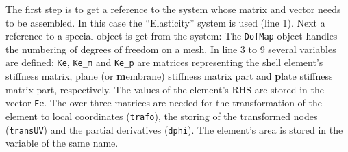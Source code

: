    The first step is to get a reference to the system whose matrix and vector needs to be assembled. In this case the ``Elasticity'' system is used (line 1). Next a reference to a special object is get from the system: The \texttt{DofMap}-object handles the numbering of degrees of freedom on a mesh. In line 3 to 9 several variables are defined: \texttt{Ke}, \texttt{Ke\_m} and \texttt{Ke\_p} are matrices representing the shell element's stiffness matrix, plane (or \textbf{m}embrane) stiffness matrix part and \textbf{p}late stiffness matrix part, respectively. The values of the element's RHS are stored in the vector \texttt{Fe}. The over three matrices are needed for the transformation of the element to local coordinates (\texttt{trafo}), the storing of the transformed nodes (\texttt{transUV}) and the partial derivatives (\texttt{dphi}). The element's area is stored in the variable of the same name.

